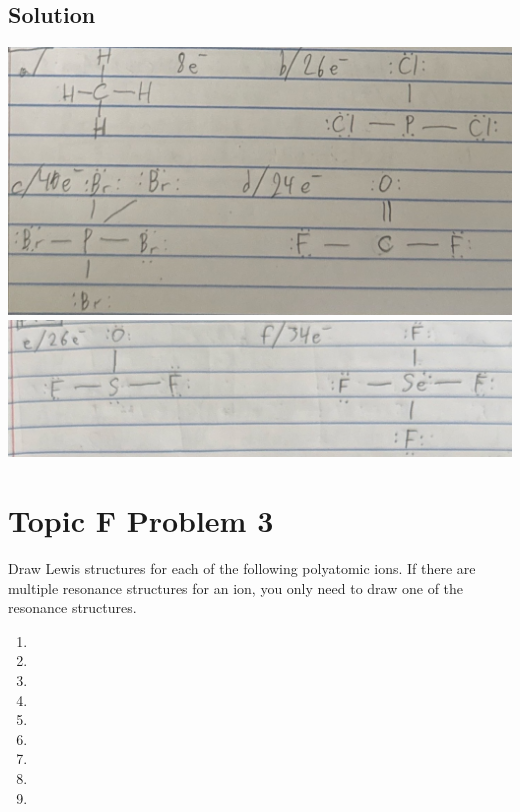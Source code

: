 \documentclass[10pt]{article}
\begin{document}
        \subsection{Solution}
            \begin{center}
                \includegraphics[width=\textwidth]{Answers Images/F2a.jpg}
                \includegraphics[width=\textwidth]{Answers Images/F2b.jpg}
            \end{center}


    \pagebreak
    \section{Topic F Problem 3}
        Draw Lewis structures for each of the following polyatomic ions. 
        If there are multiple resonance structures for an ion, you only need to draw one of the resonance structures.
        \begin{multicols}{3}
            \begin{enumerate}[label=\alph*)]
                \item   {}
                \item   {}
                \item   {}
                \item   {}
                \item   {}
                \item   {}
                \item   {}
                \item   {}
                \item   {}
            \end{enumerate}
        \end{multicols}
        
\end{document}
